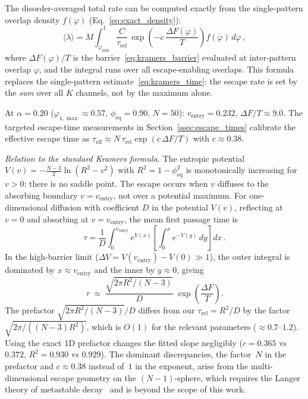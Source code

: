\documentclass[11pt]{article}
\begin{document}
The disorder-averaged total rate can be computed exactly from the single-pattern overlap density $f(\varphi)$ (Eq.~\eqref{eq:exact_density}):
\begin{equation}
\langle\lambda\rangle = M \int_{\varphi_{\min}}^{1} \frac{C}{\tau_{\mathrm{rel}}}\,\exp\!\left(-c\,\frac{\Delta F(\varphi)}{T}\right) f(\varphi)\,d\varphi\,,
\label{eq:lambda_avg}
\end{equation}
where $\Delta F(\varphi)/T$ is the barrier~\eqref{eq:kramers_barrier} evaluated at inter-pattern overlap $\varphi$, and the integral runs over all escape-enabling overlaps.  This formula replaces the single-pattern estimate~\eqref{eq:kramers_time}: the escape rate is set by the \emph{sum} over all $K$ channels, not by the maximum alone.

At $\alpha = 0.20$ ($\varphi_{1,\max} \approx 0.57$, $\phi_{\mathrm{eq}} = 0.90$, $N = 50$): $v_{\mathrm{entry}} = 0.232$, $\Delta F/T \approx 9.0$.  The targeted escape-time measurements in Section~\ref{ssec:escape_times} calibrate the effective escape time as $\tau_{\mathrm{eff}} \approx N\,\tau_{\mathrm{rel}}\exp(c\,\Delta F/T)$ with $c \approx 0.38$.

\begin{small}
\noindent\textit{Relation to the standard Kramers formula.}
The entropic potential $V(v) = -\tfrac{N-3}{2}\ln(R^2 - v^2)$ with $R^2 = 1-\phi_{\mathrm{eq}}^2$ is monotonically increasing for $v > 0$: there is no saddle point.  The escape occurs when $v$ diffuses to the absorbing boundary $v = v_{\mathrm{entry}}$, not over a potential maximum.  For one-dimensional diffusion with coefficient $D$ in the potential $V(v)$, reflecting at $v = 0$ and absorbing at $v = v_{\mathrm{entry}}$, the mean first passage time is~\citep{hanggi1990}
\[
\tau = \frac{1}{D}\int_0^{v_{\mathrm{entry}}} \!\!e^{V(x)}\left[\int_0^{x} e^{-V(y)}\,dy\right] dx\,.
\]
In the high-barrier limit ($\Delta V = V(v_{\mathrm{entry}}) - V(0) \gg 1$), the outer integral is dominated by $x \approx v_{\mathrm{entry}}$ and the inner by $y \approx 0$, giving
\[
\tau \;\approx\; \frac{\sqrt{2\pi R^2/(N\!-\!3)}}{D}\;\exp\!\left(\frac{\Delta F}{T}\right).
\]
The prefactor $\sqrt{2\pi R^2/(N-3)}/D$ differs from our $\tau_{\mathrm{rel}} = R^2/D$ by the factor $\sqrt{2\pi/((N-3)R^2)}$, which is $O(1)$ for the relevant parameters ($\approx 0.7$--$1.2$).  Using the exact 1D prefactor changes the fitted slope negligibly ($c = 0.365$ vs $0.372$, $R^2 = 0.930$ vs $0.929$).  The dominant discrepancies, the factor~$N$ in the prefactor and $c \approx 0.38$ instead of~$1$ in the exponent, arise from the multi-dimensional escape geometry on the $(N\!-\!1)$-sphere, which requires the Langer theory of metastable decay~\citep{langer1969} and is beyond the scope of this work.
\end{small}
\end{document}

